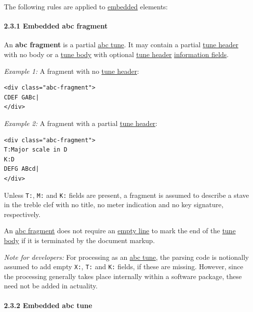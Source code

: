 \documentclass[oneside]{book}
\let\oldparagraph\paragraph
\renewcommand{\paragraph}[1]{\oldparagraph{#1}\mbox{}}
\begin{document}
The following rules are applied to
\protect\hyperlink{embedded_definition}{embedded} elements:

\hypertarget{embedded_abc_fragment}{\paragraph{2.3.1 Embedded abc
fragment}\label{embedded_abc_fragment}}

An \href{}{}\textbf{abc fragment} is a partial
\protect\hyperlink{abc_tune_definition}{abc tune}. It may contain a
partial \protect\hyperlink{tune_header_definition}{tune header} with no
body or a \protect\hyperlink{tune_body_definition}{tune body} with
optional \protect\hyperlink{tune_header_definition}{tune header}
\protect\hyperlink{information_field_definition}{information fields}.

\emph{Example 1:} A fragment with no
\protect\hyperlink{tune_header_definition}{tune header}:

\begin{verbatim}
<div class="abc-fragment">
CDEF GABc|
</div>
\end{verbatim}

\emph{Example 2:} A fragment with a partial
\protect\hyperlink{tune_header_definition}{tune header}:

\begin{verbatim}
<div class="abc-fragment">
T:Major scale in D
K:D
DEFG ABcd|
</div>
\end{verbatim}

Unless \texttt{T:}, \texttt{M:} and \texttt{K:} fields are present, a
fragment is assumed to describe a stave in the treble clef with no
title, no meter indication and no key signature, respectively.

An \protect\hyperlink{abc_fragment_definition}{abc fragment} does not
require an \protect\hyperlink{empty_line_definition}{empty line} to mark
the end of the \protect\hyperlink{tune_body_definition}{tune body} if it
is terminated by the document markup.

\emph{Note for developers:} For processing as an
\protect\hyperlink{abc_tune_definition}{abc tune}, the parsing code is
notionally assumed to add empty \texttt{X:}, \texttt{T:} and \texttt{K:}
fields, if these are missing. However, since the processing generally
takes place internally within a software package, these need not be
added in actuality.

\hypertarget{embedded_abc_tune}{\paragraph{2.3.2 Embedded abc
tune}\label{embedded_abc_tune}}
\end{document}
